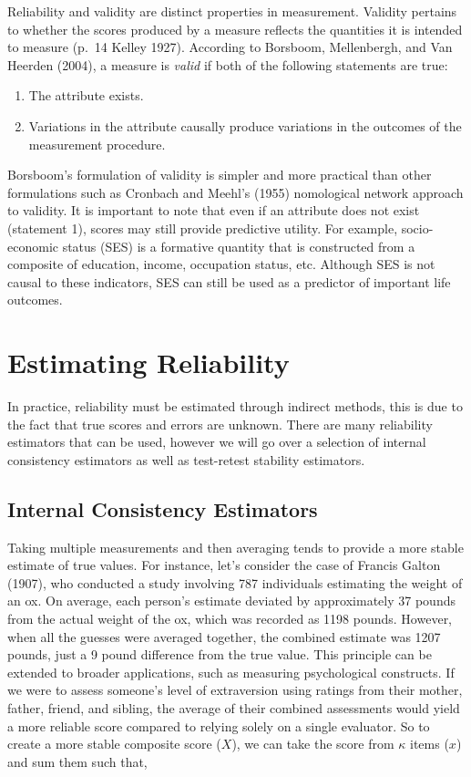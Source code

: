 \documentclass[
  letterpaper,
  DIV=11,
  numbers=noendperiod]{scrreprt}
\begin{document}
Reliability and validity are distinct properties in measurement.
Validity pertains to whether the scores produced by a measure reflects
the quantities it is intended to measure (p.~14 Kelley 1927). According
to Borsboom, Mellenbergh, and Van Heerden (2004), a measure is
\emph{valid} if both of the following statements are true:

\begin{enumerate}
\def\labelenumi{\arabic{enumi}.}
\item
  The attribute exists.
\item
  Variations in the attribute causally produce variations in the
  outcomes of the measurement procedure.
\end{enumerate}

Borsboom's formulation of validity is simpler and more practical than
other formulations such as Cronbach and Meehl's (1955) nomological
network approach to validity. It is important to note that even if an
attribute does not exist (statement 1), scores may still provide
predictive utility. For example, socio-economic status (SES) is a
formative quantity that is constructed from a composite of education,
income, occupation status, etc. Although SES is not causal to these
indicators, SES can still be used as a predictor of important life
outcomes.

\hypertarget{estimating-reliability}{%
\section{Estimating Reliability}\label{estimating-reliability}}

In practice, reliability must be estimated through indirect methods,
this is due to the fact that true scores and errors are unknown. There
are many reliability estimators that can be used, however we will go
over a selection of internal consistency estimators as well as
test-retest stability estimators.

\hypertarget{internal-consistency-estimators}{%
\subsection{Internal Consistency
Estimators}\label{internal-consistency-estimators}}

Taking multiple measurements and then averaging tends to provide a more
stable estimate of true values. For instance, let's consider the case of
Francis Galton (1907), who conducted a study involving 787 individuals
estimating the weight of an ox. On average, each person's estimate
deviated by approximately 37 pounds from the actual weight of the ox,
which was recorded as 1198 pounds. However, when all the guesses were
averaged together, the combined estimate was 1207 pounds, just a 9 pound
difference from the true value. This principle can be extended to
broader applications, such as measuring psychological constructs. If we
were to assess someone's level of extraversion using ratings from their
mother, father, friend, and sibling, the average of their combined
assessments would yield a more reliable score compared to relying solely
on a single evaluator. So to create a more stable composite score
(\(X\)), we can take the score from \(\kappa\) items (\(x\)) and sum
them such that,
\end{document}
